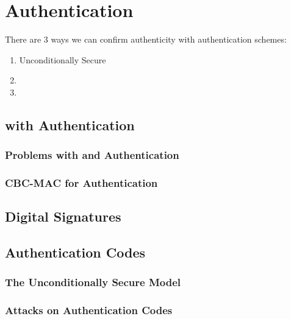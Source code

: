 \section{Authentication}\label{sec:Authentication}
There are 3 ways we can confirm authenticity with authentication schemes:
\begin{enumerate}[noitemsep]
\item Unconditionally Secure 
\item {}
\item {}
\end{enumerate}

\subsection{ with Authentication}\label{subsec:MAC_Authentication}
\subsubsection{Problems with  and Authentication}\label{subsubsec:MAC_Problems_Authentication}
\subsubsection{CBC-MAC for Authentication}\label{subsubsec:CBC_MAC_Authentication}
\subsection{Digital Signatures}\label{subsec:Digital_Signatures}
\subsection{Authentication Codes}\label{subsec:Authentication_Codes}
\begin{definition}\label{def:Authentication_Code}
\end{definition}

\subsubsection{The Unconditionally Secure Model}\label{subsubsec:Authentication_Code_Unconditionally_Secure_Model}
\subsubsection{Attacks on Authentication Codes}\label{subsubsec:Attacks_Authentication_Codes}
  
